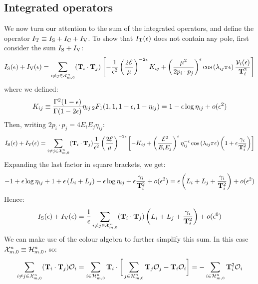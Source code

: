 \subsection{Integrated operators}

We now turn our attention to the sum of the integrated operators, and define the operator $ I_\text{T} \equiv I_\text{S} + I_\text{C} + I_\text{V} $. To show that $ I_\text{T}(\epsilon) $ does not contain any pole, first consider the sum $ I_\text{S} + I_\text{V} $:
\begin{equation*}
  I_\text{S}(\epsilon) + I_\text{V}(\epsilon) = \sum_{i \neq j \in \mathcal{X}^{n}_{m,0}} (\mathbf{T}_i \cdot \mathbf{T}_j) \left[ - \frac{1}{\epsilon^2} \left( \frac{2\mathcal{E}}{\mu} \right)^{-2\epsilon} K_{ij} + \left( \frac{\mu^2}{2p_i \cdot p_j} \right)^\epsilon \cos \left( \lambda_{ij} \pi \epsilon \right) \frac{\mathcal{V}_i(\epsilon)}{\mathbf{T}_i^2} \right]
\end{equation*}
where we defined:
\begin{equation}
  K_{ij} \equiv \frac{\Gamma^2(1-\epsilon)}{\Gamma(1-2\epsilon)} \eta_{ij} \,{_2F_1}(1,1,1-\epsilon,1-\eta_{ij}) = 1 - \epsilon \log \eta_{ij} + o(\epsilon^2)
\end{equation}
Then, writing $ 2p_i \cdot p_j = 4E_i E_j \eta_{ij} $:
\begin{equation*}
  I_\text{S}(\epsilon) + I_\text{V}(\epsilon) = \sum_{i \neq j \in \mathcal{X}^{n}_{m,0}} (\mathbf{T}_i \cdot \mathbf{T}_j) \frac{1}{\epsilon^2} \left( \frac{2\mathcal{E}}{\mu} \right)^{-2\epsilon} \left[ - K_{ij} + \left( \frac{\mathcal{E}^2}{E_i E_j} \right)^\epsilon \eta_{ij}^{-\epsilon} \cos \left( \lambda_{ij} \pi \epsilon \right) \left( 1 + \epsilon \frac{\gamma_i}{\mathbf{T}_i^2} \right) \right]
\end{equation*}
Expanding the last factor in square brackets, we get:
\begin{equation*}
  - 1 + \epsilon \log \eta_{ij} + 1 + \epsilon \left( L_i + L_j \right) - \epsilon \log \eta_{ij} + \epsilon \frac{\gamma_i}{\mathbf{T}_i^2} + o(\epsilon^2) = \epsilon \left( L_i + L_j + \frac{\gamma_i}{\mathbf{T}_i^2} \right) + o(\epsilon^2)
\end{equation*}
Hence:
\begin{equation}
  I_\text{S}(\epsilon) + I_\text{V}(\epsilon) = \frac{1}{\epsilon} \sum_{i \neq j \in \mathcal{X}^{n}_{m,0}} (\mathbf{T}_i \cdot \mathbf{T}_j) \left( L_i + L_j + \frac{\gamma_i}{\mathbf{T}_i^2} \right) + o(\epsilon^0)
  \label{eq:isv-exp}
\end{equation}
We can make use of the colour algebra to further simplify this sum. In this case $ \mathcal{X}^{n}_{m,0} \equiv \mathcal{H}^{n}_{m,0} $, so:
\begin{equation}
  \sum_{i \neq j \in \mathcal{X}^{n}_{m,0}} (\mathbf{T}_i \cdot \mathbf{T}_j) \mathcal{O}_i = \sum_{i \in \mathcal{H}^{n}_{m,0}} \mathbf{T}_i \cdot \bigg[ \sum_{j \in \mathcal{H}^{n}_{m,0}} \mathbf{T}_j \mathcal{O}_j - \mathbf{T}_i \mathcal{O}_i \bigg] = - \sum_{i \in \mathcal{H}^{n}_{m,0}} \mathbf{T}_i^2 \mathcal{O}_i
  \label{eq:co-alg}
\end{equation}
